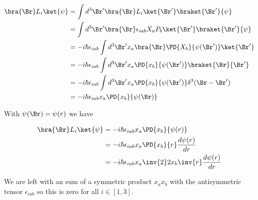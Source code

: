 \begin{align*}
\bra{\Br} L_i \ket{\psi}
&=
\int d^3 \Br' \bra{\Br} L_i \ket{\Br'} \braket{\Br'}{\psi} \\
&=
\int d^3 \Br' \bra{\Br} \epsilon_{i a b} X_a P_b \ket{\Br'} \braket{\Br'}{\psi} \\
&=
-i \hbar \epsilon_{i a b} \int d^3 \Br' x_a \bra{\Br} \PD{X_b}{\psi(\Br')} \ket{\Br'}  \\
&=
-i \hbar \epsilon_{i a b} \int d^3 \Br' x_a \PD{x_b}{\psi(\Br')} \braket{\Br}{\Br'}  \\
&=
-i \hbar \epsilon_{i a b} \int d^3 \Br' x_a \PD{x_b}{\psi(\Br')} \delta^3(\Br - \Br') \\
&=
-i \hbar \epsilon_{i a b} x_a \PD{x_b}{\psi(\Br)} 
\end{align*}

With $\psi(\Br) = \psi(r)$ we have

\begin{align*}
\bra{\Br} L_i \ket{\psi}
&=
-i \hbar \epsilon_{i a b} x_a \PD{x_b}{\psi(r)}  \\
&=
-i \hbar \epsilon_{i a b} x_a \PD{x_b}{r} \frac{d\psi(r)}{dr}  \\
&=
-i \hbar \epsilon_{i a b} x_a \inv{2} 2 x_b \inv{r} \frac{d\psi(r)}{dr}  \\
\end{align*}

We are left with an sum of a symmetric product $x_a x_b$ with the antisymmetric tensor $\epsilon_{i a b}$ so this is zero for all $i \in [1,3]$.

\EndArticle
